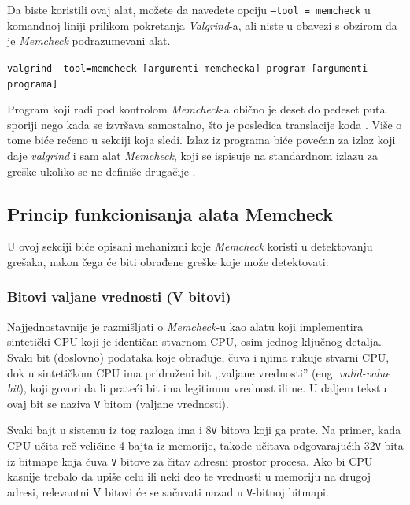 \documentclass[12pt,oneside]{memoir}
\theoremstyle{plain}
\theoremstyle{definition}
\begin{document}

Da biste koristili ovaj alat, možete da navedete opciju \texttt{--tool = memcheck} u komandnoj liniji prilikom pokretanja \textit{Valgrind}-a, ali niste u obavezi s obzirom da je \textit{Memcheck} podrazumevani alat.
 \begin{center}
\texttt{valgrind –tool=memcheck [argumenti memchecka] program [argumenti programa]}
\end{center}

Program koji radi pod kontrolom \textit{Memcheck}-a obično je deset do pedeset puta sporiji nego kada se izvršava samostalno, što je posledica translacije koda \cite{ValgrindCore}. Više o tome biće rečeno u sekciji koja sledi. Izlaz iz programa biće povećan za izlaz koji daje \textit{valgrind} i sam alat \textit{Memcheck}, koji se ispisuje na standardnom izlazu za greške ukoliko se ne definiše drugačije \cite{ValgrindDOC}. 

\subsection{Princip funkcionisanja alata Memcheck}

U ovoj sekciji biće opisani mehanizmi koje \textit{Memcheck} koristi u detektovanju grešaka, nakon čega će biti obrađene greške koje može detektovati.

\subsubsection{Bitovi valjane vrednosti (V bitovi)}
Najjednostavnije je razmišljati o \textit{Memcheck}-u kao alatu koji implementira sintetički CPU koji je identičan stvarnom CPU, osim jednog ključnog detalja. Svaki bit (doslovno) podataka koje obrađuje, čuva i njima rukuje stvarni CPU, dok u sintetičkom CPU ima pridruženi bit ,,valjane vrednosti'' (eng. \textit{valid-value bit}), koji govori da li prateći bit ima legitimnu vrednost ili ne. U daljem tekstu ovaj bit se naziva \texttt{V} bitom (valjane vrednosti).

Svaki bajt u sistemu iz tog razloga ima i 8\texttt{V} bitova koji ga prate. Na primer, kada CPU učita reč veličine 4 bajta iz memorije, takođe učitava odgovarajućih 32\texttt{V} bita iz bitmape koja čuva \texttt{V} bitove za čitav adresni prostor procesa. Ako bi CPU kasnije trebalo da upiše celu ili neki deo te vrednosti u memoriju na drugoj adresi, relevantni V bitovi će se sačuvati nazad u \texttt{V}-bitnoj bitmapi.
\end{document}
